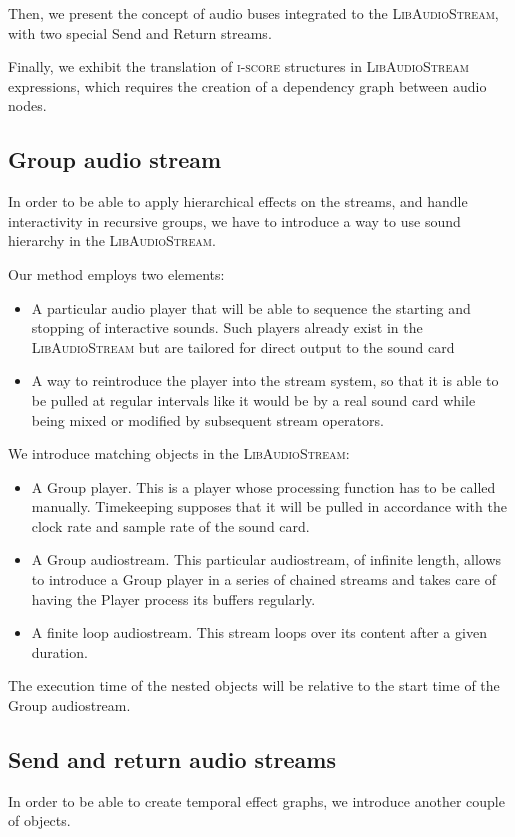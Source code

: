 \documentclass{article}
\newcommand*{\LibAudioStream}{\textsc{LibAudioStream}\xspace}
\newcommand*{\iscore}{\textsc{i-score}\xspace}
\begin{document}
Then, we present the concept of audio buses integrated to the \LibAudioStream,
with two special Send and Return streams.

Finally, we exhibit the translation of \iscore structures in \LibAudioStream expressions, 
which requires the creation of a dependency graph between audio nodes.

\subsection{Group audio stream}
In order to be able to apply hierarchical effects on the streams, 
and handle interactivity in recursive groups, we have to introduce a way to use sound hierarchy in the \LibAudioStream.

Our method employs two elements: 
\begin{itemize}
	\item A particular audio player that will be able to sequence the starting and stopping 
	of interactive sounds.
	Such players already exist in the \LibAudioStream but are tailored for direct output to
	the sound card
	\item A way to reintroduce the player into the stream system, so that it 
	is able to be pulled at regular intervals like it would be by a real sound card while being mixed or modified by subsequent stream operators.
\end{itemize}

We introduce matching objects in the \LibAudioStream: 
\begin{itemize}
	\item A Group player. This is a player whose processing function has to be called manually. 
	Timekeeping supposes that it will be pulled in accordance with the clock rate
	and sample rate of the sound card.
	\item A Group audiostream. This particular audiostream, of infinite length, 
	allows to introduce a Group player in a series of chained streams and takes care of having the Player process its buffers
    regularly.
    \item A finite loop audiostream.
    This stream loops over its content after a given duration.
\end{itemize}

The execution time of the nested objects will be relative to the start time of the Group audiostream.

\subsection{Send and return audio streams}
In order to be able to create temporal effect graphs, we introduce another couple of objects.
\end{document}
